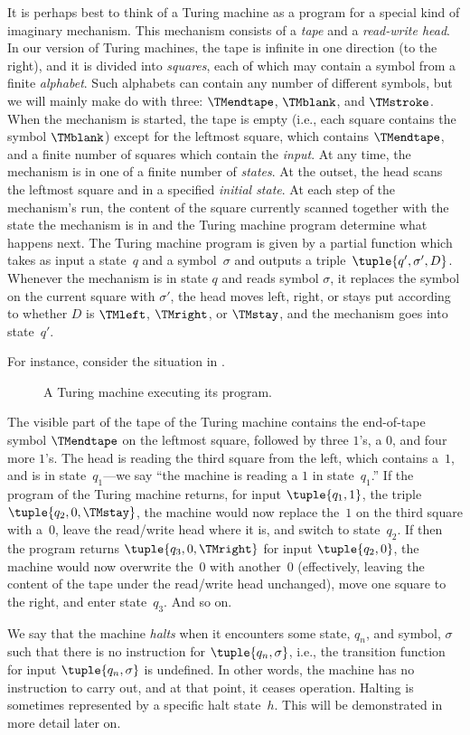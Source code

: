 \documentclass[../../../include/open-logic-section]{subfiles}
\begin{document}
\begin{explain}
It is perhaps best to think of a Turing
machine as a program for a special kind of imaginary mechanism. This
mechanism consists of a \emph{tape} and a \emph{read-write head}. In
our version of Turing machines, the tape is infinite in one direction
(to the right), and it is divided into \emph{squares}, each of which
may contain a symbol from a finite \emph{alphabet}. Such alphabets can
contain any number of different symbols, but we will mainly make do
with three: $\TMendtape$, $\TMblank$, and $\TMstroke$. When the
mechanism is started, the tape is empty (i.e., each square contains
the symbol $\TMblank$) except for the leftmost square, which contains
$\TMendtape$, and a finite number of squares which contain the
\emph{input}. At any time, the mechanism is in one of a finite number
of \emph{states}. At the outset, the head scans the leftmost square
and in a specified \emph{initial state}. At each step of the
mechanism's run, the content of the square currently scanned together
with the state the mechanism is in and the Turing machine program
determine what happens next. The Turing machine program is given by a
partial function which takes as input a state~$q$ and a
symbol~$\sigma$ and outputs a triple~$\tuple{q', \sigma',
  D}$. Whenever the mechanism is in state $q$ and reads symbol
$\sigma$, it replaces the symbol on the current square with $\sigma'$,
the head moves left, right, or stays put according to whether $D$ is
$\TMleft$, $\TMright$, or $\TMstay$, and the mechanism goes into
state~$q'$.

For instance, consider the situation in .
\begin{figure}
  \caption{A Turing machine executing its program.}
\end{figure}
The visible part of the tape of the Turing machine contains the
end-of-tape symbol $\TMendtape$ on the leftmost square, followed by
three $1$'s, a $0$, and four more $1$'s.  The
head is reading the third square from the left, which contains
a~$1$, and is in state~$q_1$---we say ``the machine is reading
a $1$ in state~$q_1$.'' If the program of the Turing machine
returns, for input $\tuple{q_1, 1}$, the triple $\tuple{q_2,
0, \TMstay}$, the machine would now replace the~$1$ on
the third square with a~$0$, leave the read/write head where it
is, and switch to state~$q_2$.  If then the program returns
$\tuple{q_3, 0, \TMright}$ for input $\tuple{q_2, 0}$,
the machine would now overwrite the~$0$ with another~$0$
(effectively, leaving the content of the tape under the read/write
head unchanged), move one square to the right, and enter state~$q_3$.
And so on.

We say that the machine \emph{halts} when it encounters some state,
$q_n$, and symbol, $\sigma$ such that there is no instruction for
$\tuple{q_n, \sigma}$, i.e., the transition function for input
$\tuple{q_n,\sigma}$ is undefined. In other words, the machine has no
instruction to carry out, and at that point, it ceases
operation. Halting is sometimes represented by a specific halt
state~$h$.  This will be demonstrated in more detail later on.
\end{explain}
\end{document}
